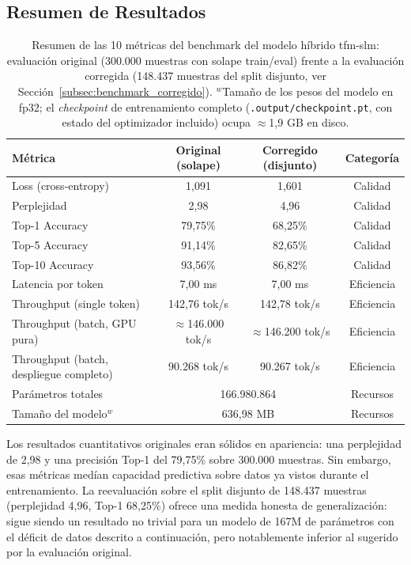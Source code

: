 \subsection{Resumen de Resultados}

\begin{table}[H]
\centering
\begin{tabularx}{\textwidth}{|X|c|c|c|}
\hline
\textbf{Métrica} & \textbf{Original (solape)} & \textbf{Corregido (disjunto)} & \textbf{Categoría} \\ \hline
Loss (cross-entropy) & 1,091 & 1,601 & Calidad \\ \hline
Perplejidad & 2,98 & 4,96 & Calidad \\ \hline
Top-1 Accuracy & 79,75\% & 68,25\% & Calidad \\ \hline
Top-5 Accuracy & 91,14\% & 82,65\% & Calidad \\ \hline
Top-10 Accuracy & 93,56\% & 86,82\% & Calidad \\ \hline
Latencia por token & 7,00 ms & 7,00 ms & Eficiencia \\ \hline
Throughput (single token) & 142,76 tok/s & 142,78 tok/s & Eficiencia \\ \hline
Throughput (batch, GPU pura) & $\approx$146.000 tok/s & $\approx$146.200 tok/s & Eficiencia \\ \hline
Throughput (batch, despliegue completo) & 90.268 tok/s & 90.267 tok/s & Eficiencia \\ \hline
Parámetros totales & \multicolumn{2}{c|}{166.980.864} & Recursos \\ \hline
Tamaño del modelo$^{w}$ & \multicolumn{2}{c|}{636,98 MB} & Recursos \\ \hline
\end{tabularx}
\caption{Resumen de las 10 métricas del benchmark del modelo híbrido tfm-slm: evaluación original (300.000 muestras con solape train/eval) frente a la evaluación corregida (148.437 muestras del split disjunto, ver Sección~\ref{subsec:benchmark_corregido}). $^{w}$Tamaño de los pesos del modelo en fp32; el \textit{checkpoint} de entrenamiento completo (\texttt{.output/checkpoint.pt}, con estado del optimizador incluido) ocupa $\approx$1,9 GB en disco.}
\label{tab:benchmark_summary}
\end{table}

Los resultados cuantitativos originales eran sólidos en apariencia: una perplejidad de 2,98 y una precisión Top-1 del 79,75\% sobre 300.000 muestras. Sin embargo, esas métricas medían capacidad predictiva sobre datos ya vistos durante el entrenamiento. La reevaluación sobre el split disjunto de 148.437 muestras (perplejidad 4,96, Top-1 68,25\%) ofrece una medida honesta de generalización: sigue siendo un resultado no trivial para un modelo de 167M de parámetros con el déficit de datos descrito a continuación, pero notablemente inferior al sugerido por la evaluación original.

